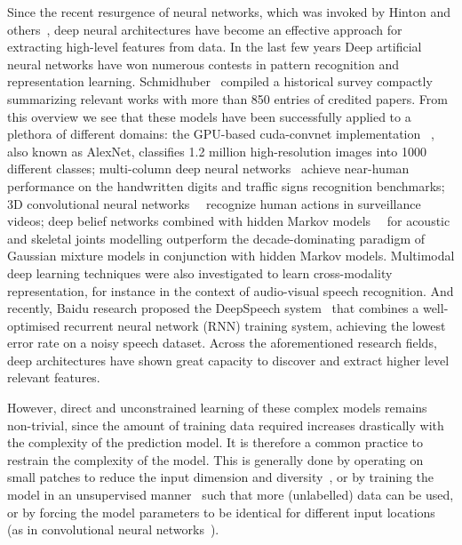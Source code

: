Since the recent resurgence of neural networks, which was invoked by Hinton and others~\cite{hinton2006fast},
deep neural architectures have become an effective approach for extracting high-level features from data.
In the last few years Deep artificial neural networks have won numerous contests in pattern recognition and representation learning.
Schmidhuber~\cite{schmidhuber2014deep} compiled a historical survey compactly summarizing relevant works with more than 850 entries of credited papers.
From this overview we see that these models have been successfully applied to a plethora of different domains: the GPU-based cuda-convnet implementation~\cite{krizhevsky2012imagenet} , also known as AlexNet, classifies 1.2 million high-resolution images into 1000 different classes; multi-column deep neural networks~\cite{ciresan2012multi} achieve near-human performance on the handwritten digits and traffic signs recognition benchmarks; 3D convolutional neural networks~\cite{3dcnn}~\cite{ji20133d} recognize human actions in surveillance videos; deep belief networks combined with hidden Markov models~\cite{mohamed2012acoustic}~\cite{diwucvpr14} for acoustic and skeletal joints modelling outperform the decade-dominating paradigm of Gaussian mixture models in conjunction with hidden Markov models.
%
Multimodal deep learning techniques were also investigated \cite{Ngiam2011multimodal} to learn cross-modality representation,
for instance in the context of audio-visual speech recognition.
%
And recently, Baidu research proposed the DeepSpeech system~\cite{hannun2014deepspeech} that combines a well-optimised recurrent neural network (RNN) training system, achieving the lowest error rate on a noisy speech dataset. Across the aforementioned research fields, deep architectures have shown great capacity to discover and extract higher level relevant features.

However, direct and unconstrained learning of these complex models remains non-trivial, since the amount of  training data required increases drastically with the complexity of the prediction model. %
It is therefore a common practice to restrain the complexity of the model. This is generally done by operating on small patches to reduce the input dimension and diversity~\cite{baccouche2005spatio}, or by training the model in an unsupervised manner~\cite{le2011learning} such that more (unlabelled) data can be used, or by forcing the model parameters to be identical for different input locations (as in convolutional neural networks~\cite{krizhevsky2012imagenet,ciresan2012multi,3dcnn}).


